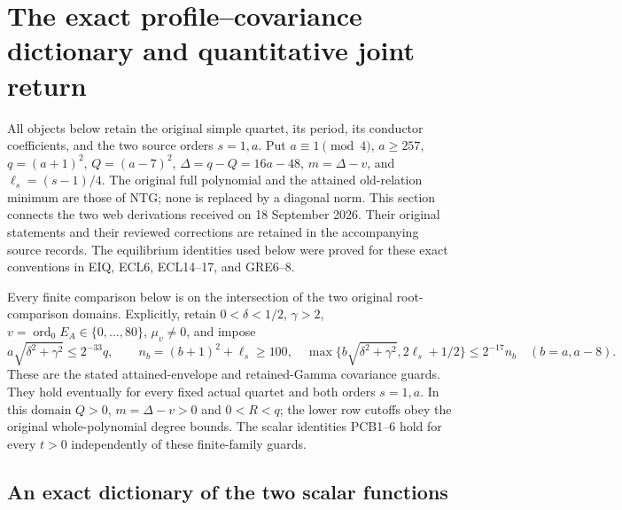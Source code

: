 \begingroup
\section{The exact profile--covariance dictionary and quantitative joint return}
\label{sec:PCB}

All objects below retain the original simple quartet, its period, its
conductor coefficients, and the two source orders $s=1,a$. Put
$a\equiv1\pmod4$, $a\ge257$, $q=(a+1)^2$, $Q=(a-7)^2$,
$\Delta=q-Q=16a-48$, $m=\Delta-v$, and $\ell_s=(s-1)/4$.
The original full polynomial and the attained old-relation minimum are
those of NTG; none is replaced by a diagonal norm. This section connects
the two web derivations received on 18 September 2026. Their original
statements and their reviewed corrections are retained in the accompanying
source records. The equilibrium identities used below were proved for
these exact conventions in EIQ, ECL6, ECL14--17, and GRE6--8.

Every finite comparison below is on the intersection of the two original
root-comparison domains. Explicitly, retain $0<\delta<1/2$, $\gamma>2$,
$v=\operatorname{ord}_0E_A\in\{0,\ldots,80\}$, $\mu_v\ne0$, and impose
\[
 a\sqrt{\delta^2+\gamma^2}\le2^{-33}q,\qquad
 n_b=(b+1)^2+\ell_s\ge100,\quad
 \max\{b\sqrt{\delta^2+\gamma^2},2\ell_s+1/2\}
       \le2^{-17}n_b\quad(b=a,a-8).
 \tag{PCB0}
\]
These are the stated attained-envelope and retained-Gamma covariance
guards. They hold eventually for every fixed actual quartet and both
orders $s=1,a$. In this domain $Q>0$, $m=\Delta-v>0$ and $0<R<q$;
the lower row cutoffs obey the original whole-polynomial degree bounds.
The scalar identities PCB1--6 hold for every $t>0$ independently of
these finite-family guards.

\subsection{An exact dictionary of the two scalar functions}

